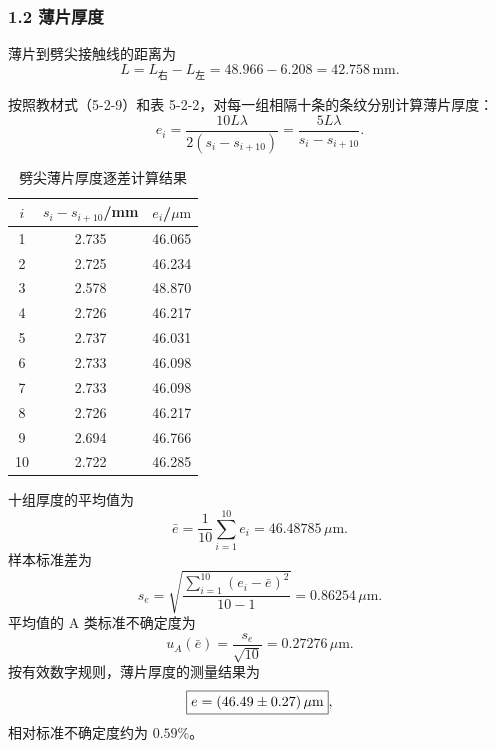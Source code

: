 \subsubsection*{1.2 薄片厚度}

薄片到劈尖接触线的距离为
\begin{equation}
  L=L_{\text{右}}-L_{\text{左}}=48.966-6.208=42.758\,\mathrm{mm}.
\end{equation}

按照教材式（5-2-9）和表 5-2-2，对每一组相隔十条的条纹分别计算薄片厚度：
\begin{equation}
  e_i=\frac{10L\lambda}{2(s_i-s_{i+10})}
  =\frac{5L\lambda}{s_i-s_{i+10}}.
\end{equation}

\begin{table}[H]
  \centering
  \caption{劈尖薄片厚度逐差计算结果}
  \label{tab:wedge-result}
  \begin{tabular}{ccc}
    \toprule
    $i$ & $s_i-s_{i+10}$/mm & $e_i$/$\mu\mathrm{m}$ \\
    \midrule
     1 & 2.735 & 46.065 \\
     2 & 2.725 & 46.234 \\
     3 & 2.578 & 48.870 \\
     4 & 2.726 & 46.217 \\
     5 & 2.737 & 46.031 \\
     6 & 2.733 & 46.098 \\
     7 & 2.733 & 46.098 \\
     8 & 2.726 & 46.217 \\
     9 & 2.694 & 46.766 \\
    10 & 2.722 & 46.285 \\
    \bottomrule
  \end{tabular}
\end{table}

十组厚度的平均值为
\begin{equation}
  \bar e=\frac{1}{10}\sum_{i=1}^{10}e_i=46.48785\,\mu\mathrm{m}.
\end{equation}
样本标准差为
\begin{equation}
  s_e=\sqrt{\frac{\sum_{i=1}^{10}(e_i-\bar e)^2}{10-1}}
  =0.86254\,\mu\mathrm{m}.
\end{equation}
平均值的 A 类标准不确定度为
\begin{equation}
  u_A(\bar e)=\frac{s_e}{\sqrt{10}}=0.27276\,\mu\mathrm{m}.
\end{equation}
按有效数字规则，薄片厚度的测量结果为
\begin{equation}
  \boxed{e=(46.49\pm0.27)\,\mu\mathrm{m}},
\end{equation}
相对标准不确定度约为 $0.59\%$。

